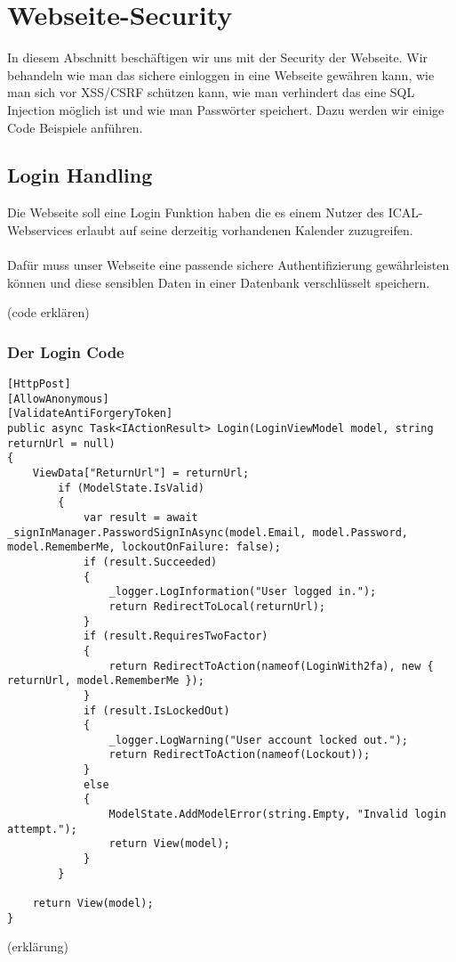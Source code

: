 \renewcommand{\theauthor}{Marcel Stering}
\section{Webseite-Security}
\label{sec:Security}
In diesem Abschnitt beschäftigen wir uns mit der Security der Webseite.
Wir behandeln wie man das sichere einloggen in eine Webseite gewähren kann, 
wie man sich vor XSS/CSRF schützen kann, wie man verhindert das eine SQL Injection
möglich ist und wie man Passwörter speichert. Dazu werden wir einige Code Beispiele anführen.

\subsection{Login Handling}
\label{sec:Login}
Die Webseite soll eine Login Funktion haben die es einem Nutzer des ICAL-Webservices erlaubt auf seine derzeitig vorhandenen Kalender zuzugreifen.\\ \\Dafür muss unser Webseite eine passende sichere Authentifizierung gewährleisten können und diese sensiblen Daten in einer Datenbank verschlüsselt speichern. 

(code erklären)
\subsubsection{Der Login Code}
\label{sec:Login_Handling_Code}
\begin{lstlisting}
[HttpPost]
[AllowAnonymous]
[ValidateAntiForgeryToken]
public async Task<IActionResult> Login(LoginViewModel model, string returnUrl = null)
{
    ViewData["ReturnUrl"] = returnUrl;
        if (ModelState.IsValid)
        {
            var result = await _signInManager.PasswordSignInAsync(model.Email, model.Password, model.RememberMe, lockoutOnFailure: false);
            if (result.Succeeded)
            {
                _logger.LogInformation("User logged in.");
                return RedirectToLocal(returnUrl);
            }
            if (result.RequiresTwoFactor)
            {
                return RedirectToAction(nameof(LoginWith2fa), new { returnUrl, model.RememberMe });
            }
            if (result.IsLockedOut)
            {
                _logger.LogWarning("User account locked out.");
                return RedirectToAction(nameof(Lockout));
            }
            else
            {
                ModelState.AddModelError(string.Empty, "Invalid login attempt.");
                return View(model);
            }
        }

    return View(model);
}
\end{lstlisting}
(erklärung)
